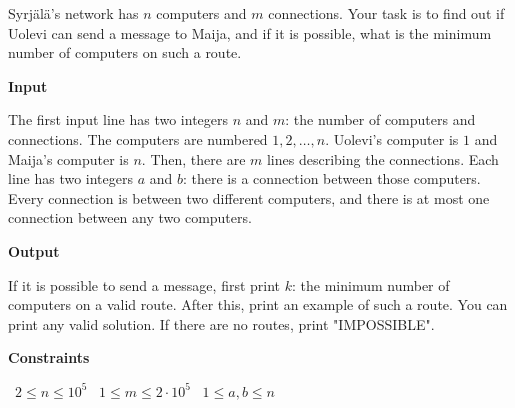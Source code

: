 Syrjälä's network has $n$ computers and $m$ connections. Your task is to find out if Uolevi can send a message to Maija, and if it is possible, what is the minimum number of computers on such a route.

\vspace{0.3cm}\noindent\textbf{Input}

The first input line has two integers $n$ and $m$: the number of computers and connections. The computers are numbered $1,2,\dots,n$. Uolevi's computer is $1$ and Maija's computer is $n$.
Then, there are $m$ lines describing the connections. Each line has two integers $a$ and $b$: there is a connection between those computers.
Every connection is between two different computers, and there is at most one connection between any two computers.

\vspace{0.3cm}\noindent\textbf{Output}

If it is possible to send a message, first print $k$: the minimum number of computers on a valid route. After this, print an example of such a route. You can print any valid solution.
If there are no routes, print "IMPOSSIBLE".

\vspace{0.3cm}\noindent\textbf{Constraints}

\textbullet\ $2 \le n \le 10^5$
\textbullet\ $1 \le m \le 2 \cdot 10^5$
\textbullet\ $1 \le a,b \le n$